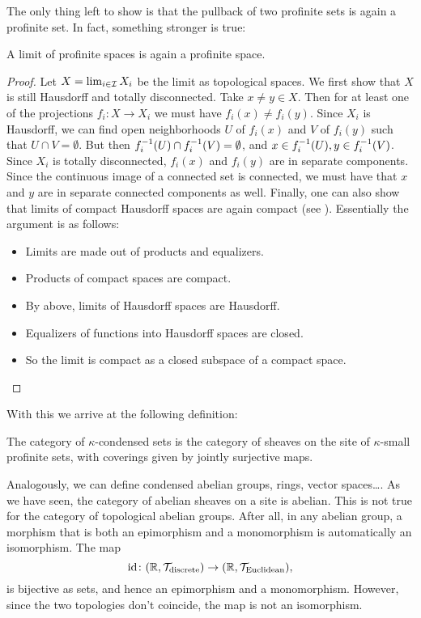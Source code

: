\documentclass{article}
\DeclareMathOperator{\id}{id}
\begin{document}
The only thing left to show is that the pullback of two profinite
sets is again a profinite set. In fact, something stronger
is true:
\begin{prop}
    \label{prop:limit_profinite}
    A limit of profinite spaces is again a profinite space.
\end{prop}
\begin{proof}
    Let $X = \lim_{i \in \mathcal{I}} X_i$ be the limit as topological spaces.
    We first show that $X$ is still Hausdorff and totally disconnected.
    Take $x\neq y \in X$. Then for at least one of the projections
    $f_i \colon X \to X_i$ we must have $f_i(x) \neq f_i(y)$. Since
    $X_i$ is Hausdorff, we can find open neighborhoods $U$ of
    $f_i(x)$ and $V$ of $f_i(y)$ such that $U\cap V = \emptyset$.
    But then $f_i^{-1}(U) \cap f_i^{-1}(V) = \emptyset$, and
    $x \in f_i^{-1}(U), y \in f_i^{-1}(V)$. Since $X_i$ is totally
    disconnected, $f_i(x)$ and $f_i(y)$ are in separate components.
    Since the continuous image of a connected set is connected,
    we must have that $x$ and $y$ are in separate
    connected components as well.
    Finally, one can also show that limits of compact Hausdorff
    spaces are again compact (see
    \cite[\href{https://stacks.math.columbia.edu/tag/08ZV}{Lemma 08ZV}]{stacks-project}).
    Essentially the argument is as follows:
    \begin{itemize}
        \item Limits are made out of products and equalizers.
        \item Products of compact spaces are compact.
        \item By above, limits of Hausdorff spaces are Hausdorff.
        \item Equalizers of functions into Hausdorff spaces are closed.
        \item So the limit is compact as a closed subspace of a compact space.
    \end{itemize}
\end{proof}
With this we arrive at the following definition:
\begin{definition}
    The category of $\kappa$-condensed sets is the
    category of sheaves on the site of $\kappa$-small
    profinite sets, with coverings given by
    jointly surjective maps.
\end{definition}
Analogously, we can define condensed abelian groups, rings, vector spaces\dots.
As we have seen, the category of abelian sheaves on a site is abelian.
This is not true for the category of topological abelian groups. After all,
in any abelian group, a morphism that is both an epimorphism and a
monomorphism is automatically an isomorphism. The map
\begin{equation*}
    \id\colon (\bbR, \mcT_{\text{discrete}}) \to (\bbR, \mcT_{\text{Euclidean}}),
\end{equation*}
is bijective as sets, and hence an epimorphism and a monomorphism. However,
since the two topologies don't coincide, the map is not an isomorphism.
\end{document}

